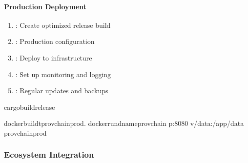 \documentclass[letterpaper,10pt,english]{sphinxmanual}
\begin{document}
\paragraph{Production Deployment}
\label{\detokenize{stack/intro-to-stack:production-deployment}}\begin{enumerate}
%
\item {} 
\sphinxAtStartPar
{}: Create optimized release build

\item {} 
\sphinxAtStartPar
{}: Production configuration

\item {} 
\sphinxAtStartPar
{}: Deploy to infrastructure

\item {} 
\sphinxAtStartPar
{}: Set up monitoring and logging

\item {} 
\sphinxAtStartPar
{}: Regular updates and backups

\end{enumerate}

\begin{sphinxVerbatim}[commandchars=\\\{\}]
cargobuild\PYGZhy{}\PYGZhy{}release

dockerbuild\PYGZhy{}tprovchain\PYGZhy{}prod.
dockerrun\PYGZhy{}d\PYGZhy{}\PYGZhy{}nameprovchain
\PYGZhy{}p:8080
\PYGZhy{}v/data:/app/data
provchain\PYGZhy{}prod
\end{sphinxVerbatim}


\subsubsection{Ecosystem Integration}
\label{\detokenize{stack/intro-to-stack:ecosystem-integration}}
\end{document}

